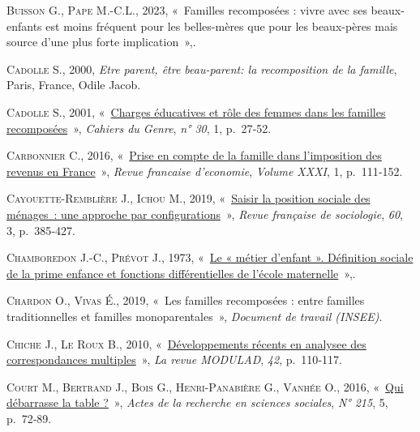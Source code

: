 \documentclass[
  12pt,
]{book}
\newlength{\cslhangindent}
\newenvironment{CSLReferences}[2] %
 {\begin{list}{}{%
  \setlength{\itemindent}{0pt}
  \setlength{\leftmargin}{0pt}
  \setlength{\parsep}{0pt}
  \ifodd #1
   \setlength{\leftmargin}{\cslhangindent}
   \setlength{\itemindent}{-1\cslhangindent}
  \fi
  \setlength{\itemsep}{#2\baselineskip}}}
 {\end{list}}
\begin{document}
\begin{CSLReferences}{0}{1}
\textsc{Buisson G.}, \textsc{Pape M.-C.L.}, 2023, {«~Familles
recomposées : vivre avec ses beaux-enfants est moins fréquent pour les
belles-mères que pour les beaux-pères mais source d{'}une plus forte
implication~»},.

\textsc{Cadolle S.}, 2000, \emph{Etre parent, être beau-parent: la
recomposition de la famille}, Paris, France, Odile Jacob.

\textsc{Cadolle S.}, 2001,
{«~\href{http://www.cairn.info/revue-cahiers-du-genre-2001-1-page-27.htm}{Charges
éducatives et rôle des femmes dans les familles recomposées}~»},
\emph{Cahiers du Genre}, \emph{n° 30}, 1, p.~27‑52.

\textsc{Carbonnier C.}, 2016,
{«~\href{https://www.cairn.info/revue-francaise-d-economie-2016-1-page-111.htm}{Prise
en compte de la famille dans l{'}imposition des revenus en France}~»},
\emph{Revue francaise d'economie}, \emph{Volume XXXI}, 1, p.~111‑152.

\textsc{Cayouette-Remblière J.}, \textsc{Ichou M.}, 2019,
{«~\href{https://doi.org/10.3917/rfs.603.0385}{Saisir la position
sociale des ménages~: une approche par configurations}~»}, \emph{Revue
française de sociologie}, \emph{60}, 3, p.~385‑427.

\textsc{Chamboredon J.-C.}, \textsc{Prévot J.}, 1973,
{«~\href{https://doi.org/10.2307/3320469}{Le « métier d'enfant ».
Définition sociale de la prime enfance et fonctions différentielles de
l'école maternelle}~»},.

\textsc{Chardon O.}, \textsc{Vivas É.}, 2019, {«~Les familles
recomposées : entre familles traditionnelles et familles
monoparentales~»}, \emph{Document de travail (INSEE)}.

\textsc{Chiche J.}, \textsc{Le Roux B.}, 2010,
{«~\href{https://hal.science/hal-00625921}{Développements récents en
analysee des correspondances multiples}~»}, \emph{La revue MODULAD},
\emph{42}, p.~110‑117.

\textsc{Court M.}, \textsc{Bertrand J.}, \textsc{Bois G.},
\textsc{Henri-Panabière G.}, \textsc{Vanhée O.}, 2016,
{«~\href{http://www.cairn.info/revue-actes-de-la-recherche-en-sciences-sociales-2016-5-page-72.htm}{Qui
débarrasse la table ?}~»}, \emph{Actes de la recherche en sciences
sociales}, \emph{N° 215}, 5, p.~72‑89.


\end{CSLReferences}
\end{document}
